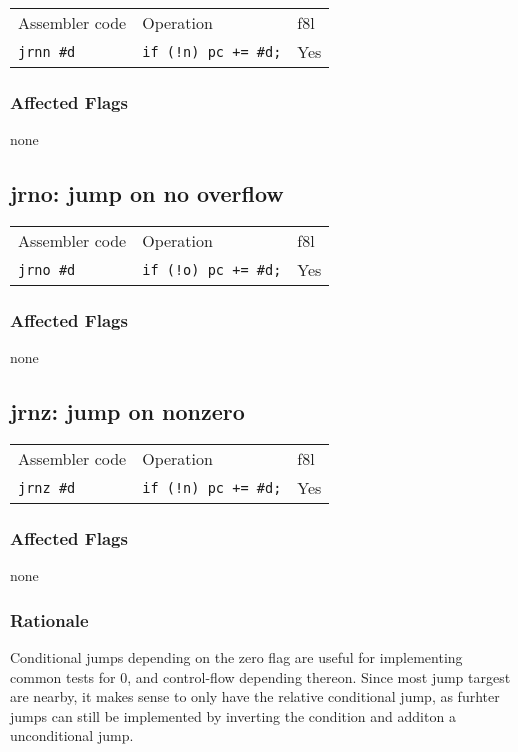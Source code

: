 \documentclass{book}
\begin{document}
\begin{tabular}{l l l}
Assembler code    & Operation                   & f8l \\
\texttt{jrnn \#d} & \texttt{if (!n) pc += \#d;} & Yes \\
\end{tabular}

\subsubsection*{Affected Flags}

none


\subsection{jrno: jump on no overflow}

\begin{tabular}{l l l}
Assembler code    & Operation                   & f8l \\
\texttt{jrno \#d} & \texttt{if (!o) pc += \#d;} & Yes \\
\end{tabular}

\subsubsection*{Affected Flags}

none


\subsection{jrnz: jump on nonzero}

\begin{tabular}{l l l}
Assembler code    & Operation                   & f8l \\
\texttt{jrnz \#d} & \texttt{if (!n) pc += \#d;} & Yes \\
\end{tabular}

\subsubsection*{Affected Flags}

none

\subsubsection*{Rationale}

Conditional jumps depending on the zero flag are useful for implementing common tests for 0, and control-flow depending thereon. Since most jump targest are nearby, it makes sense to only have the relative conditional jump, as furhter jumps can still be implemented by inverting the condition and additon a unconditional jump.
\end{document}
